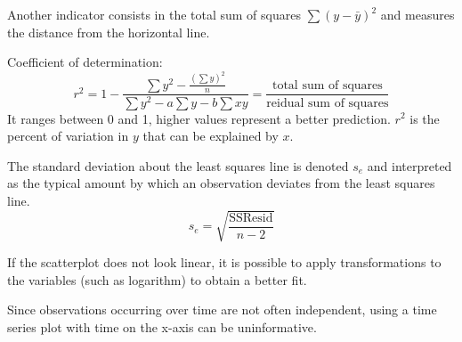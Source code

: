 Another indicator consists in the total sum of squares $\sum (y - \bar{y})^2$ and measures the distance from the horizontal line.

Coefficient of determination:
$$r^2 = 1 - \frac{\sum y^2 - \frac{(\sum y)^2}{n}}{\sum y^2 - a\sum y - b \sum xy} = \frac{\text{total sum of squares}}{\text{reidual sum of squares}}$$
It ranges between 0 and 1, higher values represent a better prediction. $r^2$ is the percent of variation in $y$ that can be explained by $x$.

The standard deviation about the least squares line is denoted $s_e$ and interpreted as the typical amount by which an observation deviates from the least squares line.
$$s_e = \sqrt{\frac{\text{SSResid}}{n - 2}}$$

If the scatterplot does not look linear, it is possible to apply transformations to the variables (such as logarithm) to obtain a better fit.

Since observations occurring over time are not often independent, using a time series plot with time on the x-axis can be uninformative.

